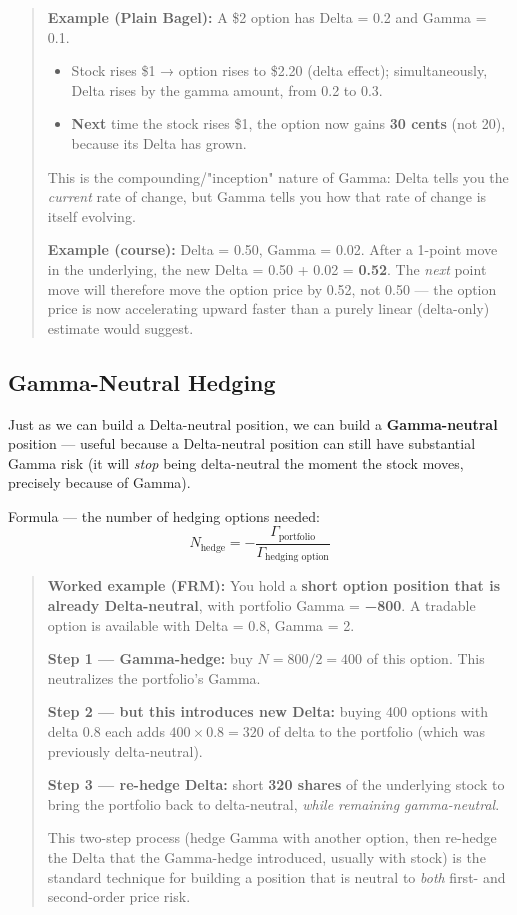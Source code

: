 \documentclass[12pt,openany]{book}
\theoremstyle{definition}
\theoremstyle{remark}
\begin{document}
\begin{quote}
\textbf{Example (Plain Bagel):} A \$2 option has Delta = 0.2 and Gamma = 0.1.
\begin{itemize}
\item Stock rises \$1 → option rises to \$2.20 (delta effect); simultaneously, Delta rises by the gamma amount, from 0.2 to 0.3.
\item \textbf{Next} time the stock rises \$1, the option now gains \textbf{30 cents} (not 20), because its Delta has grown.
\end{itemize}

This is the compounding/"inception" nature of Gamma: Delta tells you the \emph{current} rate of change, but Gamma tells you how that rate of change is itself evolving.

\textbf{Example (course):} Delta = 0.50, Gamma = 0.02.
After a 1-point move in the underlying, the new Delta = 0.50 + 0.02 = \textbf{0.52}.
The \emph{next} point move will therefore move the option price by 0.52, not 0.50 — the option price is now accelerating upward faster than a purely linear (delta-only) estimate would suggest.
\end{quote}

\subsection{Gamma-Neutral Hedging}

Just as we can build a Delta-neutral position, we can build a \textbf{Gamma-neutral} position — useful because a Delta-neutral position can still have substantial Gamma risk (it will \emph{stop} being delta-neutral the moment the stock moves, precisely because of Gamma).

Formula — the number of hedging options needed:
\[
N_{\text{hedge}} = -\frac{\Gamma_{\text{portfolio}}}{\Gamma_{\text{hedging option}}}
\]

\begin{quote}
\textbf{Worked example (FRM):}
You hold a \textbf{short option position that is already Delta-neutral}, with portfolio Gamma = \textbf{−800}.
A tradable option is available with Delta = 0.8, Gamma = 2.

\textbf{Step 1 — Gamma-hedge:} buy \(N = 800 / 2 = 400\) of this option. This neutralizes the portfolio's Gamma.

\textbf{Step 2 — but this introduces new Delta:} buying 400 options with delta 0.8 each adds \(400 \times 0.8 = 320\) of delta to the portfolio (which was previously delta-neutral).

\textbf{Step 3 — re-hedge Delta:} short \textbf{320 shares} of the underlying stock to bring the portfolio back to delta-neutral, \emph{while remaining gamma-neutral}.

This two-step process (hedge Gamma with another option, then re-hedge the Delta that the Gamma-hedge introduced, usually with stock) is the standard technique for building a position that is neutral to \emph{both} first- and second-order price risk.
\end{quote}
\end{document}
